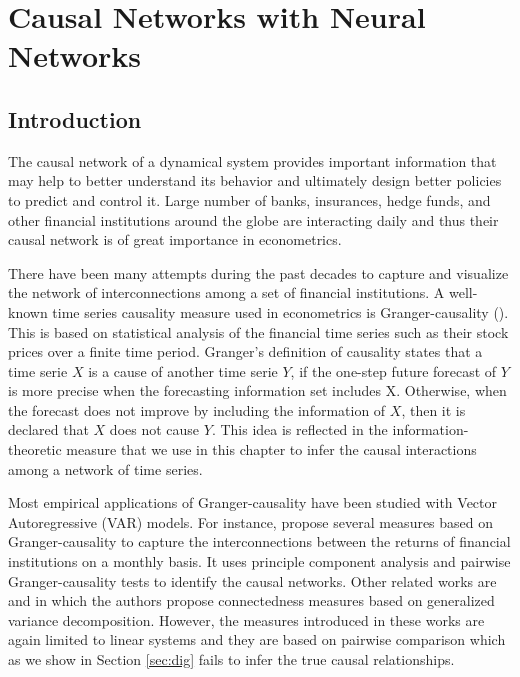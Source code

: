 \chapter{Causal Networks with Neural Networks}

\section{Introduction}\label{S:2.1}

The causal network of a dynamical system provides important information that may help to better understand its behavior and ultimately design better policies to predict and control it. 
Large number of banks, insurances, hedge funds, and other financial institutions around the globe are interacting daily and thus their causal network is of great importance in econometrics.  

There have been many attempts during the past decades to capture and visualize the network of interconnections among a set of financial institutions. 
A well-known time series causality measure used in econometrics is Granger-causality (\citet{granger}).
This is based on statistical analysis of the financial time series such as their stock prices over a finite time period. 
Granger’s definition of causality states that a time serie $X$ is a cause of another time serie $Y$, if the one-step future forecast of $Y$ is more precise when the forecasting information set includes X. 
Otherwise, when the forecast does not improve by including the information of $X$, then it is declared that $X$ does not cause $Y$.
This idea is reflected in the information-theoretic measure that we use in this chapter to infer the causal interactions among a network of time series.  

Most empirical applications of Granger-causality have been studied with Vector Autoregressive (VAR) models. 
For instance, \citet{billio2012econometric} propose several measures based on Granger-causality to capture the interconnections between the returns of financial institutions on a monthly basis. 
It uses principle component analysis and pairwise Granger-causality tests to identify the causal networks. 
Other related works are \citet{diebold2014network} and \citet{barigozzi2016network} in which the authors propose connectedness measures based on generalized variance decomposition.
However, the measures introduced in these works are again limited to linear systems and they are based on pairwise comparison which as we show in Section  \ref{sec:dig} fails to infer the true causal relationships.

